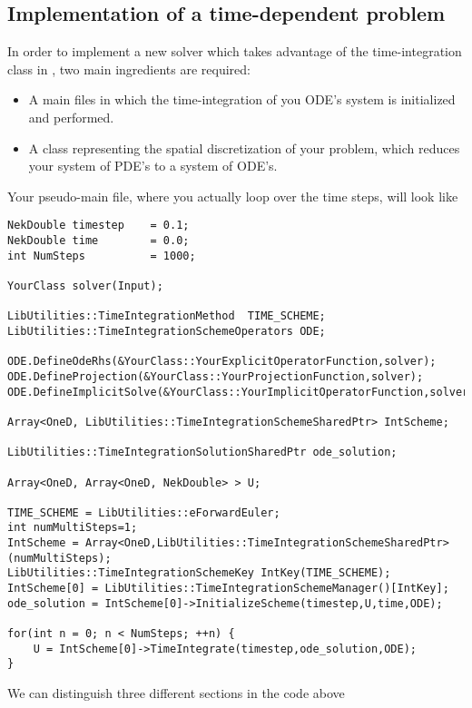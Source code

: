 \subsection{Implementation of a time-dependent problem}
In order to implement a new solver which takes advantage of the time-integration
class in {\nek}, two main ingredients are required:
\begin{itemize}
\item A main files in which the time-integration of you ODE's system is
initialized and performed.
\item A class representing the spatial discretization of your problem, which
reduces your system of PDE's to a system of ODE's.
\end{itemize}

Your pseudo-main file, where you actually loop over the time steps, will look
like
\begin{lstlisting}[style=C++Style]
NekDouble timestep    = 0.1; 
NekDouble time        = 0.0; 
int NumSteps          = 1000;

YourClass solver(Input);
    
LibUtilities::TimeIntegrationMethod  TIME_SCHEME;
LibUtilities::TimeIntegrationSchemeOperators ODE;

ODE.DefineOdeRhs(&YourClass::YourExplicitOperatorFunction,solver);
ODE.DefineProjection(&YourClass::YourProjectionFunction,solver);
ODE.DefineImplicitSolve(&YourClass::YourImplicitOperatorFunction,solver);
    
Array<OneD, LibUtilities::TimeIntegrationSchemeSharedPtr> IntScheme;
    
LibUtilities::TimeIntegrationSolutionSharedPtr ode_solution;
    
Array<OneD, Array<OneD, NekDouble> > U;

TIME_SCHEME = LibUtilities::eForwardEuler; 
int numMultiSteps=1; 
IntScheme = Array<OneD,LibUtilities::TimeIntegrationSchemeSharedPtr>(numMultiSteps); 
LibUtilities::TimeIntegrationSchemeKey IntKey(TIME_SCHEME); 
IntScheme[0] = LibUtilities::TimeIntegrationSchemeManager()[IntKey]; 
ode_solution = IntScheme[0]->InitializeScheme(timestep,U,time,ODE);

for(int n = 0; n < NumSteps; ++n) {
    U = IntScheme[0]->TimeIntegrate(timestep,ode_solution,ODE);
}
\end{lstlisting}

We can distinguish three different sections in the code above

